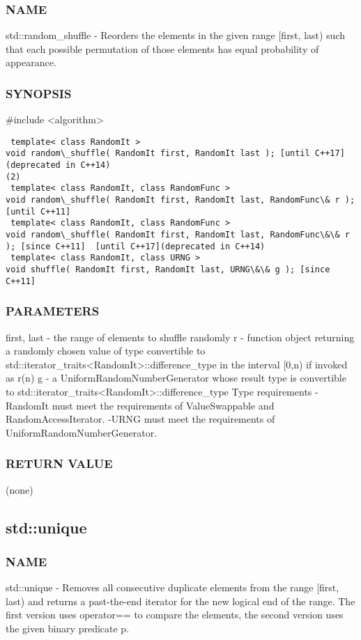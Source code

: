 \subsubsection{NAME}
std::random\_shuffle - Reorders the elements in the given range [first, last) such that each possible permutation of those elements has equal probability of appearance.

\subsubsection{SYNOPSIS}
\#include <algorithm>

\begin{lstlisting}
 template< class RandomIt >
void random\_shuffle( RandomIt first, RandomIt last ); [until C++17](deprecated in C++14)
(2)
 template< class RandomIt, class RandomFunc >
void random\_shuffle( RandomIt first, RandomIt last, RandomFunc\& r ); [until C++11]
 template< class RandomIt, class RandomFunc >
void random\_shuffle( RandomIt first, RandomIt last, RandomFunc\&\& r ); [since C++11]  [until C++17](deprecated in C++14)
 template< class RandomIt, class URNG >
void shuffle( RandomIt first, RandomIt last, URNG\&\& g ); [since C++11]
\end{lstlisting}

\subsubsection{PARAMETERS}
first, last - the range of elements to shuffle randomly
r - function object returning a randomly chosen value of type convertible to  std::iterator\_traits<RandomIt>::difference\_type in the interval [0,n) if invoked as r(n)
g - a UniformRandomNumberGenerator whose result type is convertible to std::iterator\_traits<RandomIt>::difference\_type
 Type requirements
 -RandomIt must meet the requirements of ValueSwappable and RandomAccessIterator.
 -URNG must meet the requirements of UniformRandomNumberGenerator.

\subsubsection{RETURN VALUE}
(none)



\subsection{std::unique}

\subsubsection{NAME}
std::unique - Removes all consecutive duplicate elements from the range [first, last) and returns a past-the-end iterator for the new logical end of the range.  The first version uses operator== to compare the elements, the second version uses the given binary predicate p.

